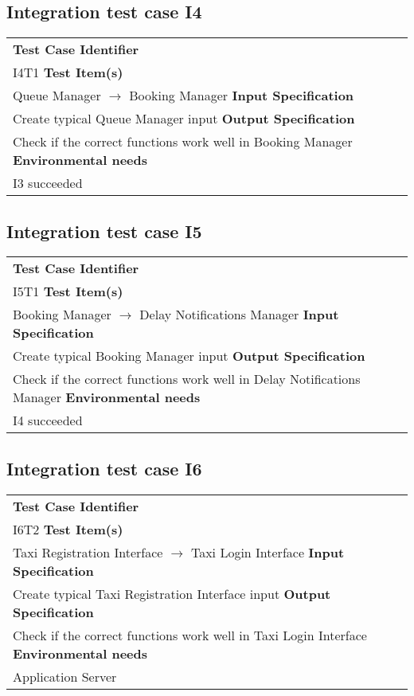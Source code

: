 \subsection{Integration test case I4}
	\begin{tabular} {l p{9cm}}
		\hline \textbf{Test Case Identifier} & \\ I4T1
		\hline \textbf{Test Item(s)} & \\ Queue Manager $\rightarrow$ Booking Manager
		\hline \textbf{Input Specification} & \\ Create typical Queue Manager input
		\hline \textbf{Output Specification} & \\ Check if the correct functions work well in Booking Manager
		\hline \textbf{Environmental needs} & \\ I3 succeeded
		\hline 
	\end{tabular}
\subsection{Integration test case I5}
	\begin{tabular} {l p{9cm}}
		\hline \textbf{Test Case Identifier} & \\ I5T1
		\hline \textbf{Test Item(s)} & \\ Booking Manager $\rightarrow$ Delay Notifications Manager
		\hline \textbf{Input Specification} & \\ Create typical Booking Manager input
		\hline \textbf{Output Specification} & \\ Check if the correct functions work well in Delay Notifications Manager
		\hline \textbf{Environmental needs} & \\ I4 succeeded
		\hline 
	\end{tabular}
\subsection{Integration test case I6}
	\begin{tabular} {l p{9cm}}
		\hline \textbf{Test Case Identifier} & \\ I6T2
		\hline \textbf{Test Item(s)} & \\ Taxi Registration Interface $\rightarrow$ Taxi Login Interface
		\hline \textbf{Input Specification} & \\ Create typical Taxi Registration Interface input
		\hline \textbf{Output Specification} & \\ Check if the correct functions work well in Taxi Login Interface
		\hline \textbf{Environmental needs} & \\ Application Server
		\hline 
	\end{tabular}